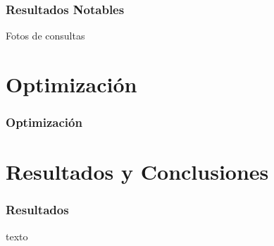 \documentclass{beamer}
\newcommand{\slideauthor}[1]{\def\insertslideauthor{#1}}
\newcommand{\insertslideauthor}{}
\begin{document}
\begin{frame}
\frametitle{Resultados Notables}
\slideauthor{Javier Comyn}
Fotos de consultas
\end{frame}

\section{Optimización}
\begin{frame}
\frametitle{Optimización}
\slideauthor{Autor 2}

\end{frame}

\section{Resultados y Conclusiones}
\begin{frame}
\frametitle{Resultados}
\slideauthor{Autor 2}
texto
\end{frame}
\end{document}
